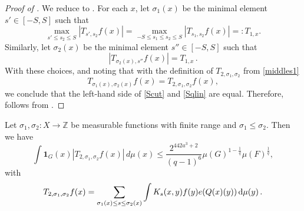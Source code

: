 \begin{proof}[Proof of ]
    \leanok
    We reduce  to . For each $x$, let $\sigma_1(x)$ be the
    minimal element $s'\in [-S,S]$ such that
    \[
    \max_{s'\le s_2\le S} |T_{s',s_2} f(x)| = \max_{-S\le s_1\le s_2\le S} |T_{s_1,s_2} f(x)| =: T_{1,x}.
    \]
    Similarly, let ${\sigma}_2(x)$ be the minimal element $s''\in [-S,S]$ such that
    \[
    |T_{\sigma_2(x), s''} f(x)| = T_{1,x}\,.
    \]
    With these choices, and noting that with the definition of $T_{2, \sigma_1, \sigma_2}$ from \eqref{middles1}
    \begin{equation*}
    T_{\sigma_1(x),\sigma_2(x)} f(x)=T_{2,\sigma_1,\sigma_2} f(x),
    \end{equation*}
    we conclude that the left-hand side of \eqref{Scut} and \eqref{Sqlin} are equal.
    Therefore,  follows from .
\end{proof}

\begin{lemma}
    \label{linearized-truncation}
    \leanok
    Let $\sigma_1,\sigma_2\colon X\to \mathbb{Z}$ be measurable functions with finite range and $\sigma_1\leq \sigma_2$.
    Then we have
    \begin{equation} \label{Sqlin}
        \int \mathbf{1}_{G}(x)
        \left| {T}_{2,\sigma_1,\sigma_2}f(x)\right|\, d\mu(x)
        \le \frac{2^{442a^3+2}}{(q-1)^6} \mu(G)^{1-\frac{1}{q}} \mu(F)^{\frac{1}{q}},
    \end{equation}
    with
    \begin{equation}\label{middles1}
        {T}_{2,\sigma_1,\sigma_2}f(x)=\sum_{\sigma_1(x) \le s\le \sigma_2(x)}
        \int K_s(x,y) f(y) e({Q}(x)(y)) \, \mathrm{d}\mu(y)\,.
    \end{equation}
\end{lemma}

